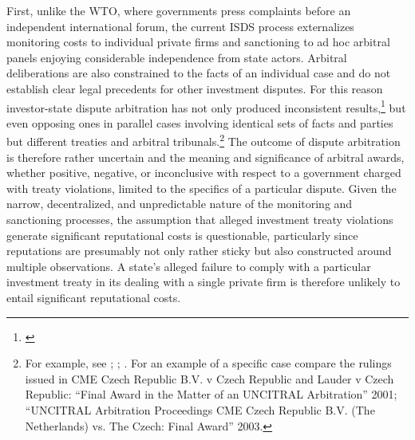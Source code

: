 \documentclass[12pt,onesided]{amsart}
\begin{document}
First, unlike the WTO, where governments press complaints before an independent international forum, the current ISDS process externalizes monitoring costs to individual private firms and sanctioning to ad hoc arbitral panels enjoying considerable independence from state actors. Arbitral deliberations are also constrained to the facts of an individual case and do not establish clear legal precedents for other investment disputes. For this reason investor-state dispute arbitration has not only produced inconsistent results,\footnote{\citet{franck:2005}} but even opposing ones in parallel cases involving identical sets of facts and parties but different treaties and arbitral tribunals.\footnote{For example, see \citet{franck:2005}; \citet{kim2011annulment}; \citet{egli2006don}. For an example of a specific case compare the rulings issued in CME Czech Republic B.V. v Czech Republic and Lauder v Czech Republic: ``Final Award in the Matter of an UNCITRAL Arbitration'' 2001; ``UNCITRAL Arbitration Proceedings CME Czech Republic B.V. (The Netherlands) vs. The Czech: Final Award'' 2003.} The outcome of dispute arbitration is therefore rather uncertain and the meaning and significance of arbitral awards, whether positive, negative, or inconclusive with respect to a government charged with treaty violations, limited to the specifics of a particular dispute. Given the narrow, decentralized, and unpredictable nature of the monitoring and sanctioning processes, the assumption that alleged investment treaty violations generate significant reputational costs is questionable, particularly since reputations are presumably not only rather sticky but also constructed around multiple observations. A state's alleged failure to comply with a particular investment treaty in its dealing with a single private firm is therefore unlikely to entail significant reputational costs.
\end{document}
